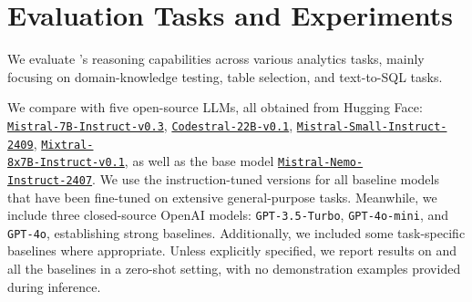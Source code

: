 \section{Evaluation Tasks and Experiments}

We evaluate \modelname's reasoning capabilities across various analytics tasks, mainly focusing on domain-knowledge testing, table selection, and text-to-SQL tasks. 


 We compare \modelname with five open-source LLMs, all obtained from Hugging Face: \href{https://huggingface.co/mistralai/Mistral-7B-Instruct-v0.3}{\texttt{Mistral-7B-Instruct-v0.3}}, \href{https://huggingface.co/mistralai/Codestral-22B-v0.1}{\texttt{Codestral-22B-v0.1}}, \href{https://huggingface.co/mistralai/Mistral-Small-Instruct-2409}{\texttt{Mistral-Small-Instruct-2409}}, \href{https://huggingface.co/mistralai/Mixtral-8x7B-Instruct-v0.1}{\texttt{Mixtral-} \\ \texttt{8x7B-Instruct-v0.1}}, as well as the base model \href{https://huggingface.co/mistralai/Mistral-Nemo-Instruct-2407}{\texttt{Mistral-Nemo-} \\ \texttt{Instruct-2407}}. We use the instruction-tuned versions for all baseline models that have been fine-tuned on extensive general-purpose tasks. Meanwhile, we include three closed-source OpenAI models: \texttt{GPT-3.5-Turbo}, \texttt{GPT-4o-mini}, and \texttt{GPT-4o}, establishing strong baselines. Additionally, we included some task-specific baselines where appropriate. Unless explicitly specified, we report results on \modelname and all the baselines in a zero-shot setting, with no demonstration examples provided during inference.

